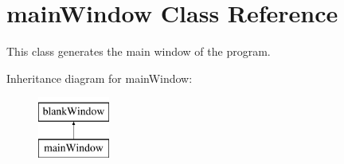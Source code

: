 \hypertarget{classgui_1_1window2_1_1mainWindow}{\section{main\-Window \-Class \-Reference}
\label{classgui_1_1window2_1_1mainWindow}
}


\-This class generates the main window of the program.  


\-Inheritance diagram for main\-Window\-:\begin{figure}[H]
\begin{center}
\leavevmode
\includegraphics[height=2.000000cm]{classgui_1_1window2_1_1mainWindow}
\end{center}
\end{figure}
